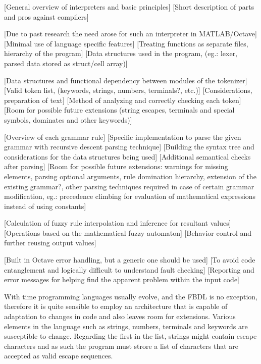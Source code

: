 


[General overview of interpreters and basic principles]
[Short description of parts and pros against compilers]

[Due to past research the need arose for such an interpreter in MATLAB/Octave]
[Minimal use of language specific features]
[Treating functions as separate files, hierarchy of the program]
[Data structures used in the program, (eg.: lexer, parsed data stored as struct/cell array)]



[Data structures and functional dependency between modules of the tokenizer]
[Valid token list, (keywords, strings, numbers, terminals?, etc.)]
[Considerations, preparation of text]
[Method of analyzing and correctly checking each token]
[Room for possible future extensions (string escapes, terminals and special symbols, dominates and other keywords)]

[Overview of each grammar rule]
[Specific implementation to parse the given grammar with recursive descent parsing technique]
[Building the syntax tree and considerations for the data structures being used]
[Additional semantical checks after parsing]
[Room for possible future extensions: warnings for missing elements, parsing optional arguments, rule domination hierarchy, extension of the existing grammar?, other parsing techniques required in case of certain grammar modification, eg.: precedence climbing for evaluation of mathematical expressions instead of using constants]

[Calculation of fuzzy rule interpolation and inference for resultant values]
[Operations based on the mathematical fuzzy automaton]
[Behavior control and further reusing output values]

[Built in Octave error handling, but a generic one should be used]
[To avoid code entanglement and logically difficult to understand fault checking]
[Reporting and error messages for helping find the apparent problem within the input code]

With time programming languages usually evolve, and the FBDL is no exception, therefore it is quite sensible to employ an architecture that is capable of adaptation to changes in code and also leaves room for extensions. Various elements in the language such as strings, numbers, terminals and keywords are susceptible to change. Regarding the first in the list, strings might contain escape characters and as such the program must strore a list of characters that are accepted as valid escape sequences. 